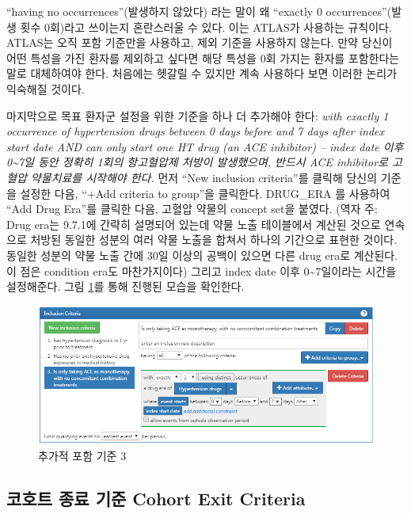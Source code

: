 \documentclass[10.5pt]{book}
\theoremstyle{definition}
\theoremstyle{definition}
\theoremstyle{definition}
\theoremstyle{remark}
\begin{document}
``having no occurrences''(발생하지 않았다) 라는 말이 왜 ``exactly 0
occurrences''(발생 횟수 0회)라고 쓰이는지 혼란스러울 수 있다. 이는
ATLAS가 사용하는 규칙이다. ATLAS는 오직 포함 기준만을 사용하고, 제외
기준을 사용하지 않는다. 만약 당신이 어떤 특성을 가진 환자를 제외하고
싶다면 해당 특성을 0회 가지는 환자를 포함한다는 말로 대체하여야 한다.
처음에는 헷갈릴 수 있지만 계속 사용하다 보면 이러한 논리가 익숙해질
것이다.

마지막으로 목표 환자군 설정을 위한 기준을 하나 더 추가해야 한다:
\emph{with exactly 1 occurrence of hypertension drugs between 0 days
before and 7 days after index start date AND can only start one HT drug
(an ACE inhibitor) -- index date 이후 0\textasciitilde{}7일 동안 정확히
1회의 항고혈압제 처방이 발생했으며, 반드시 ACE inhibitor로 고혈압
약물치료를 시작해야 한다.} 먼저 ``New inclusion criteria''를 클릭해
당신의 기준을 설정한 다음, ``+Add criteria to group''을 클릭한다.
DRUG\_ERA 를 사용하여 ``Add Drug Era''를 클릭한 다음, 고혈압 약물의
concept set을 붙였다. (역자 주: Drug era는 9.7.1에 간략히 설명되어
있는데 약물 노출 테이블에서 계산된 것으로 연속으로 처방된 동일한 성분의
여러 약물 노출을 합쳐서 하나의 기간으로 표현한 것이다. 동일한 성분의
약물 노출 간에 30일 이상의 공백이 있으면 다른 drug era로 계산된다. 이
점은 condition era도 마찬가지이다) 그리고 index date 이후
0\textasciitilde{}7일이라는 시간을 설정해준다. 그림 \ref{fig:ATLASIC3}를
통해 진행된 모습을 확인한다.

\begin{figure}

{\centering \includegraphics[width=1\linewidth]{images/Cohorts/ATLAS-IC3} 

}

\caption{추가적 포함 기준 3}\label{fig:ATLASIC3}
\end{figure}

\subsection{코호트 종료 기준 Cohort Exit
Criteria}\label{---cohort-exit-criteria}
\end{document}
